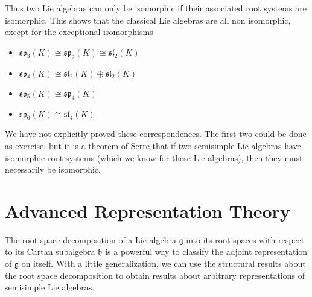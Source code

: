 Thus two Lie algebras can only be isomorphic if their associated root systems are isomorphic. This shows that the classical Lie algebras are all non isomorphic, except for the exceptional isomorphisms
%
\begin{itemize}
    \item $\mathfrak{so}_3(K) \cong \mathfrak{sp}_2(K) \cong \mathfrak{sl}_2(K)$
    \item $\mathfrak{so}_4(K) \cong \mathfrak{sl}_2(K) \oplus \mathfrak{sl}_2(K)$
    \item $\mathfrak{so}_5(K) \cong \mathfrak{sp}_4(K)$
    \item $\mathfrak{so}_6(K) \cong \mathfrak{sl}_4(K)$
\end{itemize}
%
We have not explicitly proved these correspondences. The first two could be done as exercise, but it is a theorem of Serre that if two semisimple Lie algebras have isomorphic root systems (which we know for these Lie algebras), then they must necessarily be isomorphic.


















\chapter{Advanced Representation Theory}

The root space decomposition of a Lie algebra $\mathfrak{g}$ into its root spaces with respect to its Cartan subalgebra $\mathfrak{h}$ is a powerful way to classify the adjoint representation of $\mathfrak{g}$ on itself. With a little generalization, we can use the structural results about the root space decomposition to obtain results about arbitrary representations of semisimple Lie algebras.


